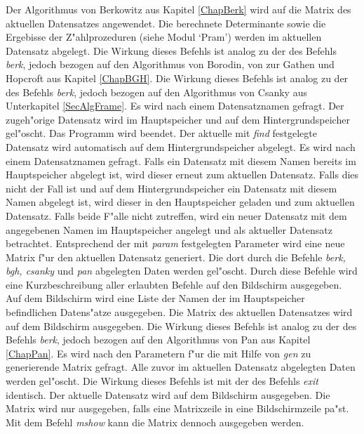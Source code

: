 \begin{MyDescription}
    Der Algorithmus von Berkowitz aus Kapitel \ref{ChapBerk} wird auf
    die Matrix des aktuellen Datensatzes angewendet. Die berechnete
    Determinante sowie die Ergebisse der Z"ahlprozeduren 
    (siehe Modul `Pram') werden im aktuellen Datensatz abgelegt.
    Die Wirkung dieses Befehls ist analog zu der des Befehls {\em berk},
    jedoch bezogen auf den Algorithmus von Borodin, von zur Gathen und
    Hopcroft aus Kapitel \ref{ChapBGH}.
    Die Wirkung dieses Befehls ist analog zu der des Befehls {\em berk},
    jedoch bezogen auf den Algorithmus von Csanky aus Unterkapitel 
    \ref{SecAlgFrame}.
    Es wird nach einem Datensatznamen gefragt. Der zugeh"orige Datensatz
    wird im Hauptspeicher und auf dem Hintergrundspeicher gel"oscht.
    Das Programm wird beendet. Der aktuelle mit {\em find} festgelegte
    Datensatz wird automatisch auf dem Hintergrundspeicher abgelegt.
    Es wird nach einem Datensatznamen gefragt. Falls ein Datensatz mit 
    diesem Namen bereits im Hauptspeicher abgelegt ist, wird dieser erneut
    zum aktuellen Datensatz. Falls dies nicht der Fall ist und auf dem 
    Hintergrundspeicher ein Datensatz mit diesem Namen abgelegt ist,
    wird dieser in den Hauptspeicher geladen und zum aktuellen Datensatz.
    Falls beide F"alle nicht zutreffen, wird ein neuer Datensatz mit dem 
    angegebenen Namen im Hauptspeicher angelegt und als aktueller 
    Datensatz betrachtet.
    Entsprechend der mit {\em param} festgelegten Parameter wird eine neue
    Matrix f"ur den aktuellen Datensatz generiert. Die dort durch die
    Befehle {\em berk, bgh, csanky} und {\em pan} abgelegten Daten werden
    gel"oscht.
    Durch diese Befehle wird eine Kurzbeschreibung aller erlaubten Befehle
    auf den Bildschirm ausgegeben.
    Auf dem Bildschirm wird eine Liste der Namen der im Hauptspeicher
    befindlichen Datens"atze ausgegeben.
    Die Matrix des aktuellen Datensatzes wird auf dem Bildschirm ausgegeben.
    Die Wirkung dieses Befehls ist analog zu der des Befehls {\em berk},
    jedoch bezogen auf den Algorithmus von Pan aus Kapitel \ref{ChapPan}.
    Es wird nach den Parametern f"ur die mit Hilfe von {\em gen} zu
    generierende Matrix gefragt. Alle zuvor im aktuellen Datensatz
    abgelegten Daten werden gel"oscht.
    Die Wirkung dieses Befehls ist mit der des Befehls {\em exit} identisch.
    Der aktuelle Datensatz wird auf dem Bildschirm ausgegeben. Die 
    Matrix wird nur ausgegeben, falls eine Matrixzeile in eine 
    Bildschirmzeile pa"st. Mit dem Befehl {\em mshow} kann die Matrix 
    dennoch ausgegeben werden.
\end{MyDescription}

